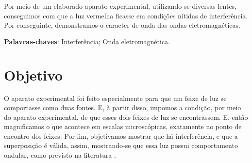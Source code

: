 \documentclass[
12pt,				%
openright,			%
oneside,			%
a4paper,			%
english,			%
french,				%
spanish,			%
brazil,				%
]{abntex2}
\begin{document}

\frenchspacing 


\imprimircapa

\imprimirfolhaderosto*



\setlength{\absparsep}{18pt} %
\begin{resumo}
Por meio de um elaborado aparato experimental, utilizando-se diversas lentes,
conseguimos com que a luz vermelha ficasse em condições nítidas de
interferência. Por conseguinte, demonstramos o caracter de onda das ondas
eletromagnéticas.
  
  \noindent
  \textbf{Palavras-chaves}: Interferência; Onda eletromagnética.
\end{resumo}

\listoffigures*
\cleardoublepage

\listoftables*
\cleardoublepage


\tableofcontents*
\cleardoublepage


\textual

\chapter[Objetivo]{Objetivo}

O aparato experimental foi feito especialmente para que um feixe de luz se
comportasse como duas fontes. E, à partir disso, impomos a condição, por meio do
aparato experimental, de que esses dois feixes de luz se encontrassem. E, então
magnificamos o que acontece em escalas microscópicas, exatamente no ponto de
encontro dos feixes. Por fim, objetivamos mostrar que há interferência, e que a
superposição é válida, assim, mostrando-se que
essa luz possui comportamento ondular, como previsto na literatura \cite{rubinowicz1957}.
\end{document}
